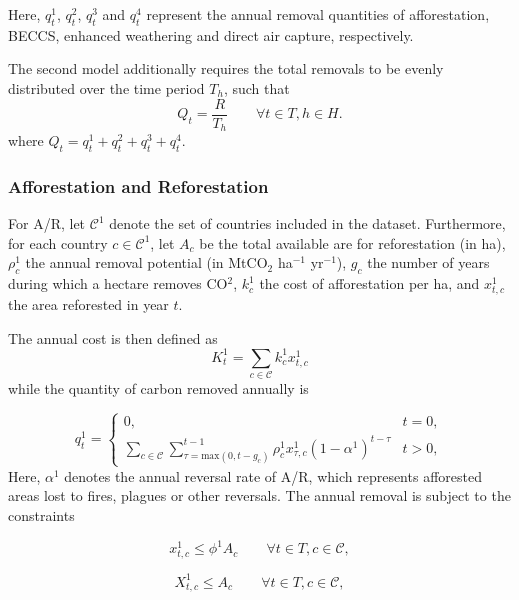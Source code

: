 Here, $q^1_t$, $q^2_t$, $q^3_t$ and $q^4_t$ represent the annual removal quantities of afforestation, BECCS, enhanced weathering and direct air capture, respectively.\vspace{2mm}

The second model additionally requires the total removals to be evenly distributed over the time period $T_h$, such that
\begin{equation}
Q_t = \frac{R}{T_h} \qquad \forall t \in T, h \in H.
\end{equation}
where $Q_t = q_t^1+q_t^2+q_t^3+q_t^4$.

\subsubsection{Afforestation and Reforestation}
For A/R, let $\mathcal{C}^1$ denote the set of countries included in the dataset. Furthermore, for each country $c\in \mathcal{C}^1$, let $A_c$ be the total available are for reforestation (in ha), $\rho_c^1$ the annual removal potential (in MtCO$_2$ ha$^{-1}$ yr$^{-1}$), $g_c$ the number of years during which a hectare removes CO$^2$, $k_c^1$ the cost of afforestation per ha, and $x_{t,c}^1$ the area reforested in year $t$.\vspace{2mm}

The annual cost is then defined as
\begin{equation}
K^1_t = \sum_{c\in \mathcal{C}}k^1_cx_{t,c}^1
\end{equation}
while the quantity of carbon removed annually is

\begin{equation}
q^1_t = 
    \begin{cases}
      0, & t = 0,\\
      \sum_{c\in \mathcal{C}}\sum_{\tau=\text{max}(0,t-g_c)}^{t-1} \rho_c^1x_{\tau,c}^1(1-\alpha^1)^{t-\tau} & t > 0,
    \end{cases} 
\end{equation}
Here, $\alpha^1$ denotes the annual reversal rate of A/R, which represents afforested areas lost to fires, plagues or other reversals. The annual removal is subject to the constraints

\begin{equation}
x_{t,c}^1 \leq \phi^1A_c  \qquad \forall t \in T, c \in \mathcal{C},
\end{equation}

\begin{equation}
X_{t,c}^1  \leq A_c  \qquad \forall t \in T, c \in \mathcal{C},
\end{equation}

